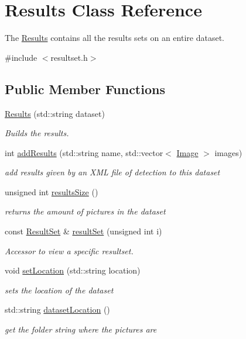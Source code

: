 \hypertarget{class_results}{}\section{Results Class Reference}
\label{class_results}


The \hyperlink{class_results}{Results} contains all the results sets on an entire dataset.  




{\ttfamily \#include $<$resultset.\+h$>$}

\subsection*{Public Member Functions}
\begin{DoxyCompactItemize}
\item 
\hyperlink{class_results_ac627f746e9b1f266c663e7f0c9ff0e6b}{Results} (std\+::string dataset)
\begin{DoxyCompactList}\small\item\em Builds the results. \end{DoxyCompactList}\item 
int \hyperlink{class_results_a34dbd962a31ef9a2e6fddce10ffc5b0e}{add\+Results} (std\+::string name, std\+::vector$<$ \hyperlink{class_image}{Image} $>$ images)
\begin{DoxyCompactList}\small\item\em add results given by an X\+ML file of detection to this dataset \end{DoxyCompactList}\item 
unsigned int \hyperlink{class_results_a61a442d7f227eec1c3be0f883c414f55}{results\+Size} ()
\begin{DoxyCompactList}\small\item\em returns the amount of pictures in the dataset \end{DoxyCompactList}\item 
const \hyperlink{class_result_set}{Result\+Set} \& \hyperlink{class_results_aa4924bf9220fbe2bc4316a28eff84b46}{result\+Set} (unsigned int i)
\begin{DoxyCompactList}\small\item\em Accessor to view a specific resultset. \end{DoxyCompactList}\item 
void \hyperlink{class_results_ab743b3785706d824fd7fcbfe4bffe7d2}{set\+Location} (std\+::string location)
\begin{DoxyCompactList}\small\item\em sets the location of the dataset \end{DoxyCompactList}\item 
std\+::string \hyperlink{class_results_af7e610ff1860b13d382bef3746aa9603}{dataset\+Location} ()
\begin{DoxyCompactList}\small\item\em get the folder string where the pictures are \end{DoxyCompactList}\end{DoxyCompactItemize}


